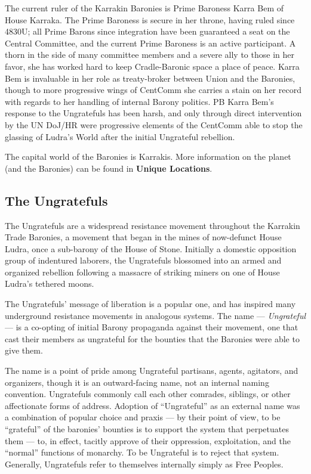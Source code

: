 The current ruler of the Karrakin Baronies is Prime Baroness Karra Bem of House Karraka. The
Prime Baroness is secure in her throne, having ruled since 4830U; all Prime Barons since
integration have been guaranteed a seat on the Central Committee, and the current Prime
Baroness is an active participant. A thorn in the side of many committee members and a severe
ally to those in her favor, she has worked hard to keep Cradle-Baronic space a place of peace.
Karra Bem is invaluable in her role as treaty-broker between Union and the Baronies, though to
more progressive wings of CentComm she carries a stain on her record with regards to her
handling of internal Barony politics. PB Karra Bem's response to the Ungratefuls has been harsh,
and only through direct intervention by the UN DoJ/HR were progressive elements of the
CentComm able to stop the glassing of Ludra's World after the initial Ungrateful rebellion.

The capital world of the Baronies is Karrakis. More information on the planet (and the Baronies)
can be found in \textbf{Unique Locations}.

\subsection{The Ungratefuls}

The Ungratefuls are a widespread resistance movement throughout the Karrakin Trade Baronies,
a movement that began in the mines of now-defunct House Ludra, once a sub-barony of the
House of Stone. Initially a domestic opposition group of indentured laborers, the Ungratefuls
blossomed into an armed and organized rebellion following a massacre of striking miners on one
of House Ludra's tethered moons.

The Ungratefuls' message of liberation is a popular one, and has inspired many underground
resistance movements in analogous systems. The name — \textit{Ungrateful} — is a co-opting of initial
Barony propaganda against their movement, one that cast their members as ungrateful for the
bounties that the Baronies were able to give them.

The name is a point of pride among Ungrateful partisans, agents, agitators, and organizers,
though it is an outward-facing name, not an internal naming convention. Ungratefuls commonly
call each other comrades, siblings, or other affectionate forms of address. Adoption of
``Ungrateful'' as an external name was a combination of popular choice and praxis — by their
point of view, to be ``grateful'' of the baronies' bounties is to support the system that perpetuates
them — to, in effect, tacitly approve of their oppression, exploitation, and the ``normal'' functions
of monarchy. To be Ungrateful is to reject that system. Generally, Ungratefuls refer to themselves
internally simply as Free Peoples.

